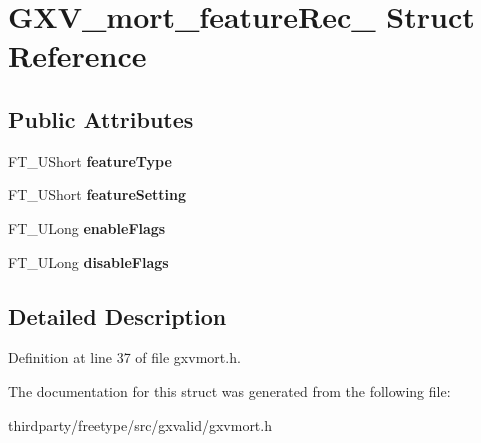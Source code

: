 \hypertarget{struct_g_x_v__mort__feature_rec__}{}\section{G\+X\+V\+\_\+mort\+\_\+feature\+Rec\+\_\+ Struct Reference}
\label{struct_g_x_v__mort__feature_rec__}
\subsection*{Public Attributes}
\begin{DoxyCompactItemize}
\item 
\mbox{\label{struct_g_x_v__mort__feature_rec___a07d7f63dcf3fd92f905dbf98718b6ad1}} 
F\+T\+\_\+\+U\+Short {\bfseries feature\+Type}
\item 
\mbox{\label{struct_g_x_v__mort__feature_rec___a3575387e97873c27e87f39def7af8537}} 
F\+T\+\_\+\+U\+Short {\bfseries feature\+Setting}
\item 
\mbox{\label{struct_g_x_v__mort__feature_rec___ae9ff6e1c398afdd2a72791c1af7e3157}} 
F\+T\+\_\+\+U\+Long {\bfseries enable\+Flags}
\item 
\mbox{\label{struct_g_x_v__mort__feature_rec___a45e12ac919f6ef9db0b1b21a5edac95b}} 
F\+T\+\_\+\+U\+Long {\bfseries disable\+Flags}
\end{DoxyCompactItemize}


\subsection{Detailed Description}


Definition at line 37 of file gxvmort.\+h.



The documentation for this struct was generated from the following file\+:\begin{DoxyCompactItemize}
\item 
thirdparty/freetype/src/gxvalid/gxvmort.\+h\end{DoxyCompactItemize}
